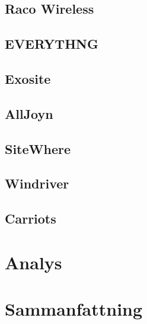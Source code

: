 \subsection{Raco Wireless}

\subsection{EVERYTHNG}

\subsection{Exosite}

\subsection{AllJoyn}

\subsection{SiteWhere}

\subsection{Windriver}

\subsection{Carriots}


\section{Analys}
\label{sec:esimluku}



\section{Sammanfattning}

